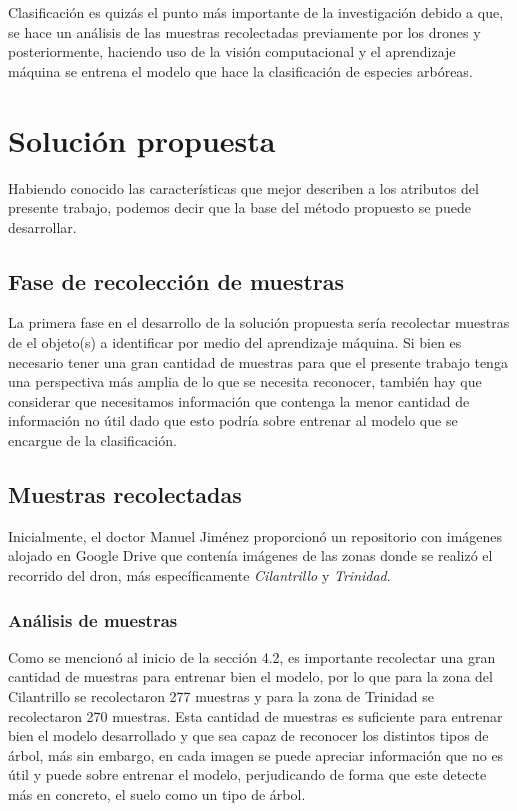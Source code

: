 Clasificación es quizás el punto más importante de la investigación debido a que, se hace un análisis de las muestras recolectadas previamente por los drones y posteriormente, haciendo uso de la visión computacional y el aprendizaje máquina se entrena el modelo que hace la clasificación de especies arbóreas.


\chapter{Solución propuesta}
Habiendo conocido las características que mejor describen a los atributos del presente trabajo, podemos decir que la base del método propuesto se puede desarrollar.

\section{Fase de recolección de muestras}
La primera fase en el desarrollo de la solución propuesta sería recolectar muestras de el objeto(s) a identificar por medio del aprendizaje máquina. Si bien es necesario tener una gran cantidad de muestras para que el presente trabajo tenga una perspectiva más amplia de lo que se necesita reconocer, también hay que considerar que necesitamos información que contenga la menor cantidad de información no útil dado que esto podría sobre entrenar al modelo que se encargue de la clasificación.

\section{Muestras recolectadas}
Inicialmente, el doctor Manuel Jiménez proporcionó un repositorio con imágenes alojado en Google Drive que contenía imágenes de las zonas donde se realizó el recorrido del dron, más específicamente \emph{Cilantrillo} y \emph{Trinidad}.

\begin{figure}
 \centering
 \par
\subfloat[[Ejemplo de muestras de la zona de Trinidad]{\texttt{[image: grid\_Trinidad]}}
\end{figure}

\subsection{Análisis de muestras}
Como se mencionó al inicio de la sección 4.2, es importante recolectar una gran cantidad de muestras para entrenar bien el modelo, por lo que para la zona del Cilantrillo se recolectaron 277 muestras y para la zona de Trinidad se recolectaron 270 muestras. Esta cantidad de muestras es suficiente para entrenar bien el modelo desarrollado y que sea capaz de reconocer los distintos tipos de árbol, más sin embargo, en cada imagen se puede apreciar información que no es útil y puede sobre entrenar el modelo, perjudicando de forma que este detecte más en concreto, el suelo como un tipo de árbol.

